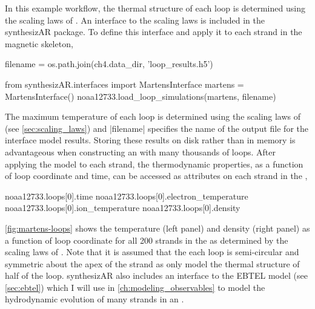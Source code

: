 In this example workflow, the thermal structure of each loop is determined using the scaling laws of \citet[see \autoref{sec:scaling_laws}]{martens_scaling_2010}. An interface to the \citeauthor{martens_scaling_2010} scaling laws is included in the synthesizAR package. To define this interface and apply it to each strand in the magnetic skeleton,
\begin{pycode}[chapter4]
filename = os.path.join(ch4.data_dir, 'loop_results.h5')
\end{pycode}
\begin{pyblock}[chapter4][baselinestretch=1,xleftmargin=3em]
from synthesizAR.interfaces import MartensInterface
martens = MartensInterface()
noaa12733.load_loop_simulations(martens, filename)
\end{pyblock}
The maximum temperature of each loop is determined using the scaling laws of \citet{rosner_dynamics_1978} (see \autoref{sec:scaling_laws}) and \pyv|filename| specifies the name of the output file for the interface model results. Storing these results on disk rather than in memory is advantageous when constructing an \AR{} with many thousands of loops. After applying the model to each strand, the thermodynamic properties, as a function of loop coordinate and time, can be accessed as attributes on each strand in the \AR{},
\begin{pyblock}[chapter4][baselinestretch=1,xleftmargin=3em]
noaa12733.loops[0].time
noaa12733.loops[0].electron_temperature
noaa12733.loops[0].ion_temperature
noaa12733.loops[0].density
\end{pyblock}
\autoref{fig:martens-loops} shows the temperature (left panel) and density (right panel) as a function of loop coordinate for all 200 strands in the \AR{} as determined by the scaling laws of \citet{martens_scaling_2010}. Note that it is assumed that the each loop is semi-circular and symmetric about the apex of the strand as \citeauthor{martens_scaling_2010} only model the thermal structure of half of the loop. synthesizAR also includes an interface to the EBTEL model (see \autoref{sec:ebtel}) which I will use in \autoref{ch:modeling_observables} to model the hydrodynamic evolution of many strands in an \AR{}.

